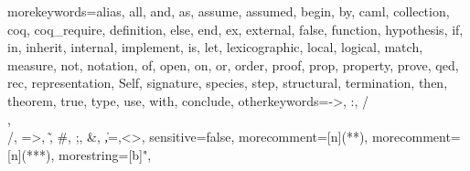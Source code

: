 \usepackage{fullpage}
\usepackage{listings}
\usepackage{times}   %
\usepackage{changepage}
\usepackage{framed}

\newcommand{\ocaml}{{\sf OCaml}}
\newcommand{\focal}{{\sf Fo\-Ca\-Li\-Ze}}
\newcommand{\focalizec}{{\sf focalizec}}
\newcommand{\zenon}{{\sf Zenon}}
\newcommand{\coq}{{\sf Coq}}

  {morekeywords={alias, all, and, as, assume, assumed, begin, by, caml,
      collection, coq, coq_require, definition, else, end,
      ex, external, false, function, hypothesis, if, in,
      inherit, internal, implement, is, let, lexicographic,
      local, logical, match, measure, not, notation, of, open,
      on, or, order, proof, prop, property, prove, qed, rec,
      representation, Self, signature, species, step,
      structural, termination, then, theorem, true, type, use,
      with, conclude},
    otherkeywords={->, :, /\\, \\/, =>, \~, \#, ;, \&, \|,=,<>},
    sensitive=false,
    morecomment=[n]{(*}{*)},  %
    morecomment=[n]{(**}{*)}, %
    morestring=[b]",
  }

\newcommand{\setlangfocalize}{
\lstset{
  language=FoCaLiZe, tabsize=2, frame=none, breaklines=true,
  basicstyle=\ttfamily, xleftmargin=1mm
}
}
\setlangfocalize


\newenvironment{faqitem}[0]{\begin{framed}\begin{adjustwidth}{2em}{0em}}{\end{adjustwidth}\end{framed}}
